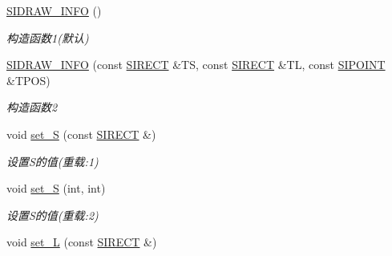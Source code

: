 \begin{DoxyCompactItemize}
\item 
\mbox{\label{class_s_i_d_r_a_w___i_n_f_o_a2a34a37accb2d31386f1ac4003375227}} 
\hyperlink{class_s_i_d_r_a_w___i_n_f_o_a2a34a37accb2d31386f1ac4003375227}{S\+I\+D\+R\+A\+W\+\_\+\+I\+N\+FO} ()
\begin{DoxyCompactList}\small\item\em 构造函数1(默认) \end{DoxyCompactList}\item 
\mbox{\label{class_s_i_d_r_a_w___i_n_f_o_a48107d70e4071d1d925f722085876c3a}} 
\hyperlink{class_s_i_d_r_a_w___i_n_f_o_a48107d70e4071d1d925f722085876c3a}{S\+I\+D\+R\+A\+W\+\_\+\+I\+N\+FO} (const \hyperlink{struct_s_i_r_e_c_t}{S\+I\+R\+E\+CT} \&TS, const \hyperlink{struct_s_i_r_e_c_t}{S\+I\+R\+E\+CT} \&TL, const \hyperlink{struct_s_i_p_o_i_n_t}{S\+I\+P\+O\+I\+NT} \&T\+P\+OS)
\begin{DoxyCompactList}\small\item\em 构造函数2 \end{DoxyCompactList}\item 
\mbox{\label{class_s_i_d_r_a_w___i_n_f_o_aa4c9bdd6f914bc65d2900a9e6b5fa46e}} 
void \hyperlink{class_s_i_d_r_a_w___i_n_f_o_aa4c9bdd6f914bc65d2900a9e6b5fa46e}{set\+\_\+S} (const \hyperlink{struct_s_i_r_e_c_t}{S\+I\+R\+E\+CT} \&)
\begin{DoxyCompactList}\small\item\em 设置\+S的值(重载\+:1) \end{DoxyCompactList}\item 
\mbox{\label{class_s_i_d_r_a_w___i_n_f_o_ae3f97d9ad0701d3efe0bcda63b02c021}} 
void \hyperlink{class_s_i_d_r_a_w___i_n_f_o_ae3f97d9ad0701d3efe0bcda63b02c021}{set\+\_\+S} (int, int)
\begin{DoxyCompactList}\small\item\em 设置\+S的值(重载\+:2) \end{DoxyCompactList}\item 
\mbox{\label{class_s_i_d_r_a_w___i_n_f_o_ae70aee6b53f6bb4f52e8c70ea6094565}} 
void \hyperlink{class_s_i_d_r_a_w___i_n_f_o_ae70aee6b53f6bb4f52e8c70ea6094565}{set\+\_\+L} (const \hyperlink{struct_s_i_r_e_c_t}{S\+I\+R\+E\+CT} \&)

\end{DoxyCompactItemize}
